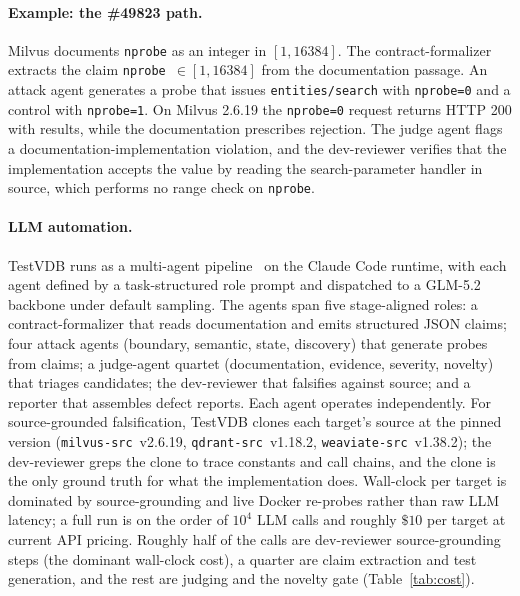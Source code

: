 \documentclass[sigconf]{acmart}
\begin{document}
\paragraph{Example: the \#49823 path.}
Milvus documents \texttt{nprobe} as an integer in $[1, 16384]$. The contract-formalizer extracts the claim \texttt{nprobe}~$\in [1, 16384]$ from the documentation passage. An attack agent generates a probe that issues \texttt{entities/search} with \texttt{nprobe=0} and a control with \texttt{nprobe=1}. On Milvus 2.6.19 the \texttt{nprobe=0} request returns HTTP 200 with results, while the documentation prescribes rejection. The judge agent flags a documentation-implementation violation, and the dev-reviewer verifies that the implementation accepts the value by reading the search-parameter handler in source, which performs no range check on \texttt{nprobe}.

\paragraph{LLM automation.}
TestVDB runs as a multi-agent pipeline~\cite{hou23llmse} on the Claude Code runtime, with each agent defined by a task-structured role prompt and dispatched to a GLM-5.2 backbone under default sampling. The agents span five stage-aligned roles: a contract-formalizer that reads documentation and emits structured JSON claims; four attack agents (boundary, semantic, state, discovery) that generate probes from claims; a judge-agent quartet (documentation, evidence, severity, novelty) that triages candidates; the dev-reviewer that falsifies against source; and a reporter that assembles defect reports. Each agent operates independently. For source-grounded falsification, TestVDB clones each target's source at the pinned version (\texttt{milvus-src}~v2.6.19, \texttt{qdrant-src}~v1.18.2, \texttt{weaviate-src}~v1.38.2); the dev-reviewer greps the clone to trace constants and call chains, and the clone is the only ground truth for what the implementation does. Wall-clock per target is dominated by source-grounding and live Docker re-probes rather than raw LLM latency; a full run is on the order of $10^4$ LLM calls and roughly $\$10$ per target at current API pricing. Roughly half of the calls are dev-reviewer source-grounding steps (the dominant wall-clock cost), a quarter are claim extraction and test generation, and the rest are judging and the novelty gate (Table~\ref{tab:cost}).
\end{document}
